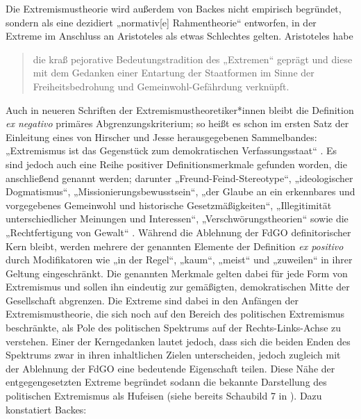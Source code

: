 Die Extremismustheorie wird außerdem von Backes nicht empirisch begründet, sondern als eine dezidiert „normativ{[}e{]} Rahmentheorie`` \autocite*[18]{backesPolitischerExtremismusDemokratischen1989} entworfen, in der Extreme im Anschluss an Aristoteles als etwas Schlechtes gelten. Aristoteles habe

\begin{quote}
die kraß pejorative Bedeutungstradition des „Extremen`` geprägt und diese mit dem Gedanken einer Entartung der Staatformen im Sinne der Freiheitsbedrohung und Gemeinwohl-Gefährdung verknüpft. \autocite[23]{backesVergleichendeExtremismusforschung2005}
\end{quote}

Auch in neueren Schriften der Extremismustheoretiker*innen bleibt die Definition \emph{ex negativo} primäres Abgrenzungskriterium; so heißt es schon im ersten Satz der Einleitung eines von Hirscher und Jesse herausgegebenen Sammelbandes: „Extremismus ist das Gegenstück zum demokratischen Verfassungsstaat`` \autocite*[9]{hirscherExtremismusDeutschland2013}. Es sind jedoch auch eine Reihe positiver Definitionsmerkmale gefunden worden, die anschließend genannt werden; darunter „Freund-Feind-Stereotype``, „ideologischer Dogmatismus``, „Missionierungsbewusstsein``, „der Glaube an ein erkennbares und vorgegebenes Gemeinwohl und historische Gesetzmäßigkeiten``, „Illegitimität unterschiedlicher Meinungen und Interessen``, „Verschwörungstheorien`` sowie die „Rechtfertigung von Gewalt`` \autocite[9-10]{hirscherExtremismusDeutschland2013}. Während die Ablehnung der FdGO definitorischer Kern bleibt, werden mehrere der genannten Elemente der Definition \emph{ex positivo} durch Modifikatoren wie „in der Regel``, „kaum``, „meist`` und „zuweilen`` in ihrer Geltung eingeschränkt. Die genannten Merkmale gelten dabei für jede Form von Extremismus und sollen ihn eindeutig zur gemäßigten, demokratischen Mitte der Gesellschaft abgrenzen. Die Extreme sind dabei in den Anfängen der Extremismustheorie, die sich noch auf den Bereich des politischen Extremismus beschränkte, als Pole des politischen Spektrums auf der Rechts-Links-Achse zu verstehen. Einer der Kerngedanken lautet jedoch, dass sich die beiden Enden des Spektrums zwar in ihren inhaltlichen Zielen unterscheiden, jedoch zugleich mit der Ablehnung der FdGO eine bedeutende Eigenschaft teilen. Diese Nähe der entgegengesetzten Extreme begründet sodann die bekannte Darstellung des politischen Extremismus als Hufeisen (siehe bereits Schaubild 7 in \citealt[252]{backesPolitischerExtremismusDemokratischen1989}). Dazu konstatiert Backes:

